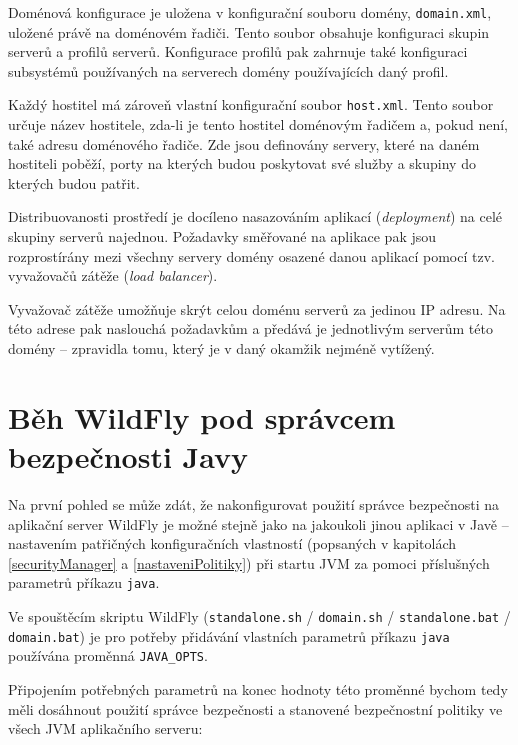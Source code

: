 Doménová konfigurace je uložena v konfigurační souboru domény, {\tt domain.xml}, uložené právě na doménovém řadiči.
Tento soubor obsahuje konfiguraci skupin serverů a profilů serverů.
Konfigurace profilů pak zahrnuje také konfiguraci subsystémů používaných na serverech domény používajících daný profil.
\cite{jbossDomainSetup}

Každý hostitel má zároveň vlastní konfigurační soubor {\tt host.xml}.
Tento soubor určuje název hostitele, zda-li je tento hostitel doménovým řadičem a, pokud není, také adresu doménového řadiče.
Zde jsou definovány servery, které na daném hostiteli poběží, porty na kterých budou poskytovat své služby a skupiny do kterých budou patřit.
\cite{jbossDomainSetup}

Distribuovanosti prostředí je docíleno nasazováním aplikací ({\it deployment}) na celé skupiny serverů najednou.
Požadavky směřované na aplikace pak jsou rozprostírány mezi všechny servery domény osazené danou aplikací pomocí tzv. vyvažovačů zátěže ({\it load balancer}).
\cite{jbossLoadBalancing}

Vyvažovač zátěže umožňuje skrýt celou doménu serverů za jedinou IP adresu.
Na této adrese pak naslouchá požadavkům a předává je jednotlivým serverům této domény -- zpravidla tomu, který je v daný okamžik nejméně vytížený.
\cite{jbossLoadBalancing}

\section{Běh WildFly pod správcem bezpečnosti Javy}

Na první pohled se může zdát, že nakonfigurovat použití správce bezpečnosti na aplikační server WildFly je možné stejně jako na jakoukoli jinou aplikaci v Javě -- nastavením patřičných konfiguračních vlastností (popsaných v kapitolách \ref{securityManager} a \ref{nastaveniPolitiky}) při startu JVM za pomoci příslušných parametrů příkazu {\tt java}.

Ve spouštěcím skriptu WildFly ({\tt standalone.sh} / {\tt domain.sh} / {\tt standalone.bat} / {\tt domain.bat}) je pro potřeby přidávání vlastních parametrů příkazu {\tt java} používána proměnná {\tt JAVA\_OPTS}.

Připojením potřebných parametrů na konec hodnoty této proměnné bychom tedy měli dosáhnout použití správce bezpečnosti a stanovené bezpečnostní politiky ve všech JVM aplikačního serveru: \cite{jbossSecurityManager}

